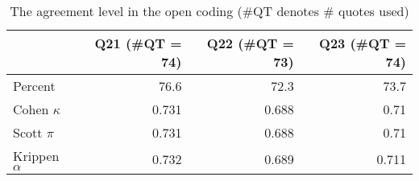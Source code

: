 \begin{table}[t]
\caption{The agreement level in the open
coding (\#QT denotes \# quotes used)}
\label{table: agreement level}
\centering
\begin{tabular}{lrrr}
\toprule
                & \textbf{Q21} (\#QT = 74) & \textbf{Q22} (\#QT = 73) & \textbf{Q23} (\#QT = 74) \\ %
                \midrule
Percent         & 76.6         & 72.3         & 73.7         \\ %
Cohen   $\kappa$        & 0.731        & 0.688        & 0.71         \\ %
Scott  $\pi$         & 0.731        & 0.688        & 0.71         \\ %
Krippen  $\alpha$       & 0.732        & 0.689        & 0.711        \\ %

\bottomrule
\end{tabular}
\end{table}